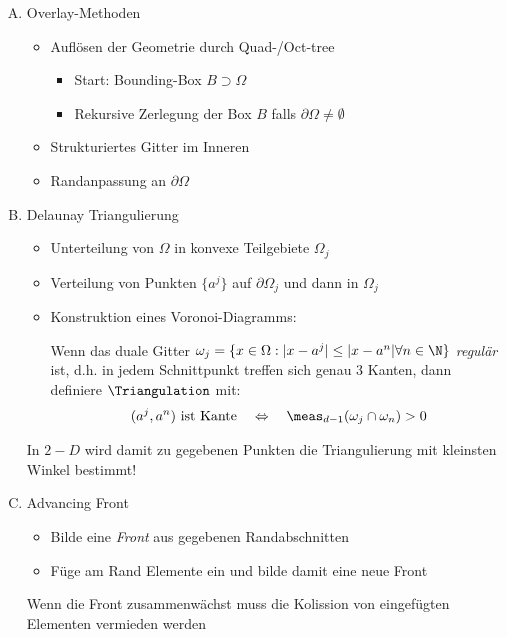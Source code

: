 \begin{enumerate}[A)]
    \item
      Overlay-Methoden
      \begin{itemize}
          \item
            Auflösen der Geometrie durch Quad-/Oct-tree
            \begin{itemize}
                \item
                  Start: Bounding-Box $B \supset \Omega$
                \item
                  Rekursive Zerlegung der Box $B$ falls $\partial\Omega \neq
                  \emptyset$
            \end{itemize}
          \item
            Strukturiertes Gitter im Inneren
          \item
            Randanpassung an $\partial\Omega$
      \end{itemize}
    \item
      Delaunay Triangulierung
      \begin{itemize}
          \item
            Unterteilung von $\Omega$ in konvexe Teilgebiete $\Omega_j$
          \item
            Verteilung von Punkten $\{a^j\}$ auf $\partial\Omega_j$ und dann in
            $\Omega_j$
          \item
            Konstruktion eines Voronoi-Diagramms:
            
            Wenn das duale Gitter
            $\omega_j = \{x\in \Omega: |x - a^j| \le |x - a^n| \forall n\in \N\}$
            \emph{regulär} ist, d.h. in jedem Schnittpunkt treffen sich genau
            3 Kanten, dann definiere $\Triangulation$ mit:
            \begin{eqnarray*}
                (a^j, a^n) \text{ ist Kante}
                \quad \Leftrightarrow \quad
                \meas_{d-1}(\omega_j \cap \omega_n) > 0
            \end{eqnarray*}
      \end{itemize}
      \begin{Bemerkung}
          In $2-D$ wird damit zu gegebenen Punkten die Triangulierung mit
          kleinsten Winkel bestimmt!
      \end{Bemerkung}
    \item
      Advancing Front
      \begin{itemize}
          \item
            Bilde eine \emph{Front} aus gegebenen Randabschnitten
          \item
            Füge am Rand Elemente ein und bilde damit eine neue Front
      \end{itemize}
      Wenn die Front zusammenwächst muss die Kolission von eingefügten
      Elementen vermieden werden
\end{enumerate}


